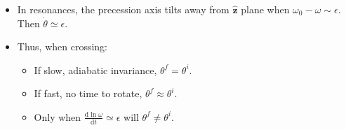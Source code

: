 \documentclass[dvipsnames, 8pt]{beamer}
\newcommand*{\rd}[2]{\frac{\mathrm{d}#1}{\mathrm{d}#2}}
\newcommand*{\bm}[1]{\boldsymbol{\mathbf{#1}}}
\newcommand*{\uv}[1]{\hat{\bm{#1}}}
\begin{document}
\begin{frame}
\begin{columns}
\begin{column}{0.5\textwidth}
\begin{itemize}
                \item In resonances, the precession axis tilts away from
                    $\uv{z}$ plane when $\omega_0 - \omega \sim \epsilon$. Then
                    $\dot{\theta} \simeq \epsilon$.

                \item Thus, when crossing:
                    \begin{itemize}
                        \item If slow, adiabatic invariance, $\theta^f =
                            \theta^i$.
                        \item If fast, no time to rotate, $\theta^f \approx
                            \theta^i$.
                        \item Only when $\rd{\ln \omega}{t} \simeq \epsilon$
                            will $\theta^f \neq \theta^i$.
                    \end{itemize}
            \end{itemize}
        \end{column}
    \end{columns}
\end{frame}
\end{document}
